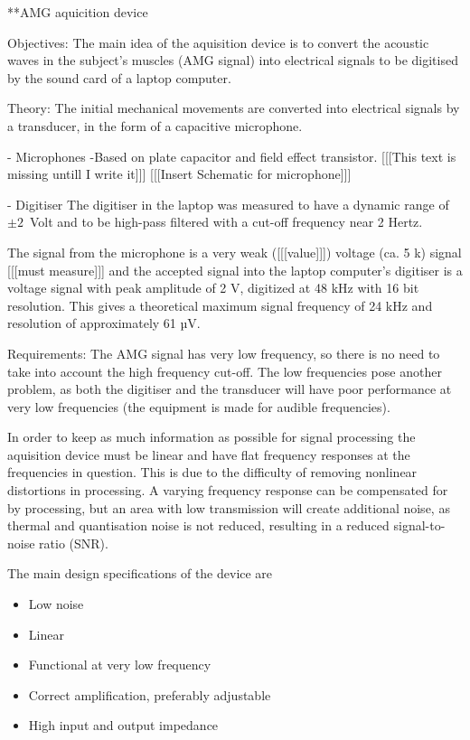 **AMG aquicition device

Objectives:
The main idea of the aquisition device is to convert the acoustic waves in the subject's muscles (AMG signal) into electrical signals to be digitised by the sound card of a laptop computer.


Theory:
The initial mechanical movements are converted into electrical signals by a transducer, in the form of a capacitive microphone.
 
 - Microphones
 -Based on plate capacitor and field effect transistor.
[[[This text is missing untill I write it]]]
[[[Insert Schematic for microphone]]]
 
 - Digitiser
The digitiser in the laptop was measured to have a dynamic range of $\pm 2$ Volt and to be high-pass filtered with a cut-off frequency near 2 Hertz.

The signal from the microphone is a very weak ([[[value]]]) voltage (ca. 5 k\Omega) signal [[[must measure]]] and the accepted signal into the laptop computer's digitiser is a voltage signal with peak amplitude of 2 V, digitized at 48 kHz with 16 bit resolution. This gives a theoretical maximum signal frequency of 24 kHz and resolution of approximately 61 µV.


Requirements:
The AMG signal has very low frequency, so there is no need to take into account the high frequency cut-off. The low frequencies pose another problem, as both the digitiser and the transducer will have poor performance at very low frequencies (the equipment is made for audible frequencies).

In order to keep as much information as possible for signal processing the aquisition device must be linear and have flat frequency responses at the frequencies in question. This is due to the difficulty of removing nonlinear distortions in processing. A varying frequency response can be compensated for by processing, but an area with low transmission will create additional noise, as thermal and quantisation noise is not reduced, resulting in a reduced signal-to-noise ratio (SNR).

The main design specifications of the device are
\begin{itemize}
  \item Low noise
  \item Linear
  \item Functional at very low frequency
  \item Correct amplification, preferably adjustable
  \item High input and output impedance
\end{itemize}


